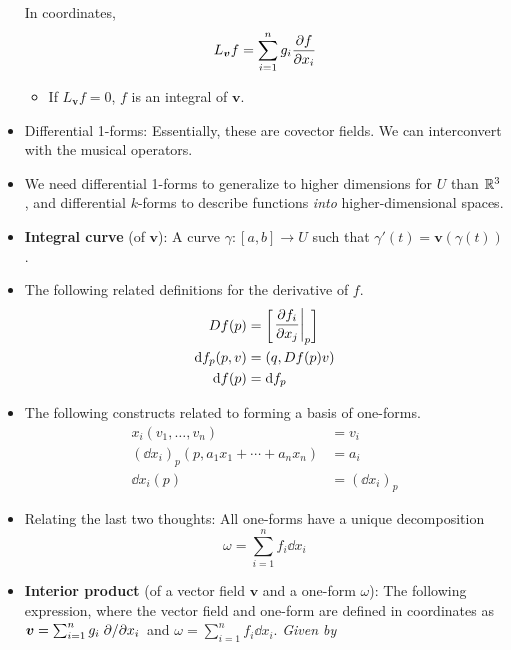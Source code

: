 \documentclass[../notes.tex]{subfiles}
\begin{document}
\begin{itemize}
    In coordinates,
    \begin{equation*}
        L_{\bm{v}}f = \sum_{i=1}^ng_i\pdv{f}{x_i}
    \end{equation*}
    \begin{itemize}
        \item If $L_{\bm{v}}f=0$, $f$ is an integral of $\bm{v}$.
    \end{itemize}
    \item Differential 1-forms: Essentially, these are covector fields. We can interconvert with the musical operators.
    \item We need differential 1-forms to generalize to higher dimensions for $U$ than $\mathbb{R}^3$, and differential $k$-forms to describe functions \emph{into} higher-dimensional spaces.
    \item \textbf{Integral curve} (of $\bm{v}$): A curve $\gamma:[a,b]\to U$ such that $\gamma'(t)=\bm{v}(\gamma(t))$.
    \item The following related definitions for the derivative of $f$.
    \begin{align*}
        Df(p) &=
        \begin{bmatrix}
            \eval{\displaystyle\pdv{f_i}{x_j}}_p
        \end{bmatrix}\\
        \dd f_p(p,v) &= (q,Df(p)v)\\
        \dd f(p) &= \dd f_p
    \end{align*}
    \item The following constructs related to forming a basis of one-forms.
    \begin{align*}
        x_i(v_1,\dots,v_n) &= v_i\\
        (\dd x_i)_p(p,a_1x_1+\cdots+a_nx_n) &= a_i\\
        \dd x_i(p) &= (\dd x_i)_p
    \end{align*}
    \item Relating the last two thoughts: All one-forms have a unique decomposition
    \begin{equation*}
        \omega = \sum_{i=1}^nf_i\dd x_i
    \end{equation*}
    \item \textbf{Interior product} (of a vector field $\bm{v}$ and a one-form $\omega$): The following expression, where the vector field and one-form are defined in coordinates as $\bm{v}=\sum_{i=1}^ng_i\pdv*{x_i}$ and $\omega=\sum_{i=1}^nf_i\dd{x_i}$. \emph{Given by}
    \begin{equation*}

\end{equation*}
\end{itemize}
\end{document}
